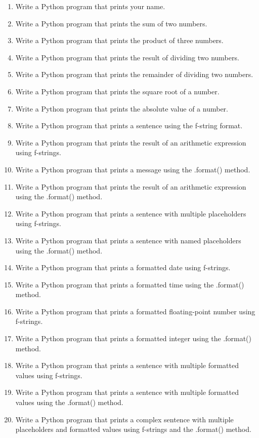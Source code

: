 \documentclass[12pt]{book}
\begin{document}
\begin{enumerate}
\item Write a Python program that prints your name.
\item Write a Python program that prints the sum of two numbers.
\item Write a Python program that prints the product of three numbers.
\item Write a Python program that prints the result of dividing two numbers.
\item Write a Python program that prints the remainder of dividing two numbers.
\item Write a Python program that prints the square root of a number.
\item Write a Python program that prints the absolute value of a number.
\item Write a Python program that prints a sentence using the f-string format.
\item Write a Python program that prints the result of an arithmetic expression using f-strings.
\item Write a Python program that prints a message using the .format() method.
\item Write a Python program that prints the result of an arithmetic expression using the .format() method.
\item Write a Python program that prints a sentence with multiple placeholders using f-strings.
\item Write a Python program that prints a sentence with named placeholders using the .format() method.
\item Write a Python program that prints a formatted date using f-strings.
\item Write a Python program that prints a formatted time using the .format() method.
\item Write a Python program that prints a formatted floating-point number using f-strings.
\item Write a Python program that prints a formatted integer using the .format() method.
\item Write a Python program that prints a sentence with multiple formatted values using f-strings.
\item Write a Python program that prints a sentence with multiple formatted values using the .format() method.
\item Write a Python program that prints a complex sentence with multiple placeholders and formatted values using f-strings and the .format() method.
\end{enumerate}
\end{document}
